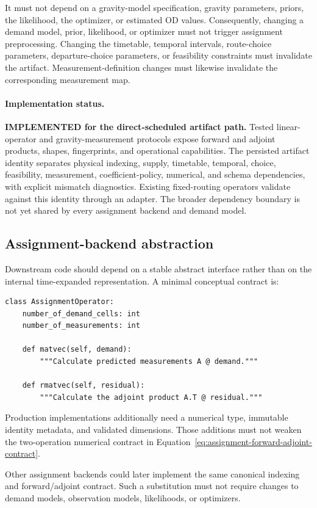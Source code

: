 It must not depend on a gravity-model specification, gravity parameters,
priors, the likelihood, the optimizer, or estimated OD values.  Consequently,
changing a demand model, prior, likelihood, or optimizer must not trigger
assignment preprocessing.  Changing the timetable, temporal intervals,
route-choice parameters, departure-choice parameters, or feasibility
constraints must invalidate the artifact.  Measurement-definition changes
must likewise invalidate the corresponding measurement map.

\paragraph{Implementation status.}
\textbf{IMPLEMENTED for the direct-scheduled artifact path.}  Tested
linear-operator and gravity-measurement protocols expose forward and adjoint
products, shapes, fingerprints, and operational capabilities.  The persisted
artifact identity separates physical indexing, supply, timetable, temporal,
choice, feasibility, measurement, coefficient-policy, numerical, and schema
dependencies, with explicit mismatch diagnostics.  Existing fixed-routing
operators validate against this identity through an adapter.  The broader
dependency boundary is not yet shared by every assignment backend and demand
model.

\subsection{Assignment-backend abstraction}

Downstream code should depend on a stable abstract interface rather than on the
internal time-expanded representation.  A minimal conceptual contract is:
\begin{verbatim}
class AssignmentOperator:
    number_of_demand_cells: int
    number_of_measurements: int

    def matvec(self, demand):
        """Calculate predicted measurements A @ demand."""

    def rmatvec(self, residual):
        """Calculate the adjoint product A.T @ residual."""
\end{verbatim}
Production implementations additionally need a numerical type, immutable
identity metadata, and validated dimensions.  Those additions must not weaken
the two-operation numerical contract in
Equation~\eqref{eq:assignment-forward-adjoint-contract}.

Other assignment backends could later implement the same canonical indexing
and forward/adjoint contract.  Such a substitution must not require changes to
demand models, observation models, likelihoods, or optimizers.


